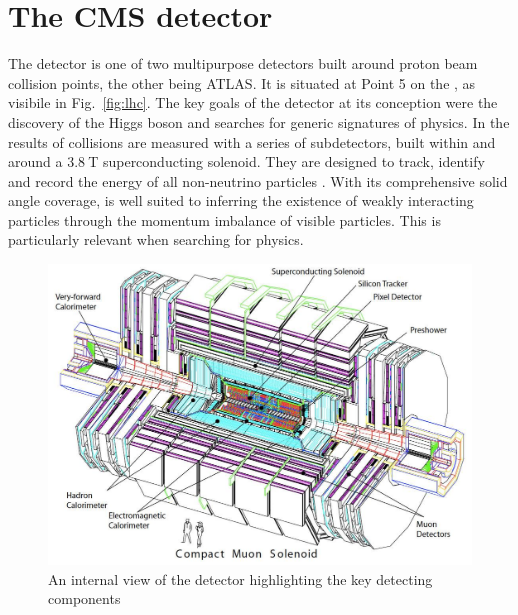 \section{The CMS detector} \label{sec:cms}

The \CMS detector is one of two multipurpose detectors built around
proton beam collision points, the other being ATLAS. It is situated at
Point 5 on the \LHC, as visibile in Fig.~\ref{fig:lhc}. The key goals
of the \CMS detector at its conception were the discovery of the \SM
Higgs boson and searches for generic signatures of \BSM physics. In \CMS the
results of collisions are measured with a series of subdetectors,
built within and around a $3.8~$T superconducting solenoid. They are designed to
track, identify and record the energy of all non-neutrino \SM particles
\cite{Bayatian:2006zz}. With its comprehensive solid
angle coverage, \CMS is well suited to inferring the existence of
weakly interacting particles through the momentum imbalance of visible
particles. This is particularly relevant when searching for \BSM
physics.

\begin{figure}
\begin{center}
\includegraphics[width=0.8\linewidth]{figs/cms_detector} \end{center}
\caption{An internal view of the \CMS detector
highlighting the key detecting components \cite{Bayatian:2006zz}}
\label{fig:CMS} \end{figure}

